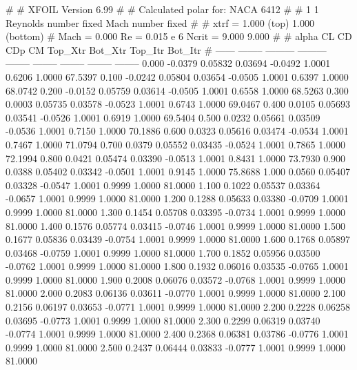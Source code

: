 #  
#       XFOIL         Version 6.99
#  
# Calculated polar for: NACA 6412                                       
#  
# 1 1 Reynolds number fixed          Mach number fixed         
#  
# xtrf =   1.000 (top)        1.000 (bottom)  
# Mach =   0.000     Re =     0.015 e 6     Ncrit =   9.000  9.000
#  
#   alpha    CL        CD       CDp       CM     Top_Xtr  Bot_Xtr  Top_Itr  Bot_Itr
#  ------ -------- --------- --------- -------- -------- -------- -------- --------
   0.000  -0.0379   0.05832   0.03694  -0.0492   1.0001   0.6206   1.0000  67.5397
   0.100  -0.0242   0.05804   0.03654  -0.0505   1.0001   0.6397   1.0000  68.0742
   0.200  -0.0152   0.05759   0.03614  -0.0505   1.0001   0.6558   1.0000  68.5263
   0.300   0.0003   0.05735   0.03578  -0.0523   1.0001   0.6743   1.0000  69.0467
   0.400   0.0105   0.05693   0.03541  -0.0526   1.0001   0.6919   1.0000  69.5404
   0.500   0.0232   0.05661   0.03509  -0.0536   1.0001   0.7150   1.0000  70.1886
   0.600   0.0323   0.05616   0.03474  -0.0534   1.0001   0.7467   1.0000  71.0794
   0.700   0.0379   0.05552   0.03435  -0.0524   1.0001   0.7865   1.0000  72.1994
   0.800   0.0421   0.05474   0.03390  -0.0513   1.0001   0.8431   1.0000  73.7930
   0.900   0.0388   0.05402   0.03342  -0.0501   1.0001   0.9145   1.0000  75.8688
   1.000   0.0560   0.05407   0.03328  -0.0547   1.0001   0.9999   1.0000  81.0000
   1.100   0.1022   0.05537   0.03364  -0.0657   1.0001   0.9999   1.0000  81.0000
   1.200   0.1288   0.05633   0.03380  -0.0709   1.0001   0.9999   1.0000  81.0000
   1.300   0.1454   0.05708   0.03395  -0.0734   1.0001   0.9999   1.0000  81.0000
   1.400   0.1576   0.05774   0.03415  -0.0746   1.0001   0.9999   1.0000  81.0000
   1.500   0.1677   0.05836   0.03439  -0.0754   1.0001   0.9999   1.0000  81.0000
   1.600   0.1768   0.05897   0.03468  -0.0759   1.0001   0.9999   1.0000  81.0000
   1.700   0.1852   0.05956   0.03500  -0.0762   1.0001   0.9999   1.0000  81.0000
   1.800   0.1932   0.06016   0.03535  -0.0765   1.0001   0.9999   1.0000  81.0000
   1.900   0.2008   0.06076   0.03572  -0.0768   1.0001   0.9999   1.0000  81.0000
   2.000   0.2083   0.06136   0.03611  -0.0770   1.0001   0.9999   1.0000  81.0000
   2.100   0.2156   0.06197   0.03653  -0.0771   1.0001   0.9999   1.0000  81.0000
   2.200   0.2228   0.06258   0.03695  -0.0773   1.0001   0.9999   1.0000  81.0000
   2.300   0.2299   0.06319   0.03740  -0.0774   1.0001   0.9999   1.0000  81.0000
   2.400   0.2368   0.06381   0.03786  -0.0776   1.0001   0.9999   1.0000  81.0000
   2.500   0.2437   0.06444   0.03833  -0.0777   1.0001   0.9999   1.0000  81.0000
